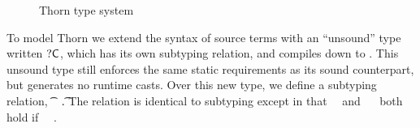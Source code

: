 \documentclass[acmlarge, anonymous, authordraft]{acmart}
\begin{document}
\begin{figure}
\hrulefill
\begin{mathpar}










\end{mathpar}
\hrulefill
\caption{Thorn type system}\label{f:thornts}
\end{figure}

To model Thorn we extend the syntax of source terms with an ``unsound'' type
written $\dt\C$, which has its own subtyping relation, and compiles down to
\any. This unsound type still enforces the same static requirements as its
sound counterpart, but generates no runtime casts.  Over this new type, we
define a subtyping relation, \t~\src\Sub~\t. The relation is identical to
\kafka subtyping except in that \dt\C~\src\Sub~\dt\D and \C~\src\Sub~\dt\D
both hold if \C~\src\Sub~\D.  
\end{document}
